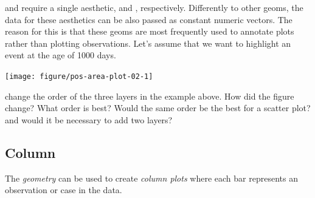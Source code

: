 \documentclass[krantz2]{krantz}\usepackage{knitr}%
\begin{document}
 and  require a single aesthetic,  and , respectively. Differently to other geoms, the data for these aesthetics can be also passed as constant numeric vectors. The reason for this is that these geoms are most frequently used to annotate plots rather than plotting observations. Let's assume that we want to highlight an event at the age of 1000 days.

\begin{knitrout}\footnotesize
{}\color{fgcolor}\begin{kframe}
\begin{alltt}
\hlstd{(} 
       \hlstd{(}      \hlopt{+}
  \hlstd{(} \hlstd{=} \hlstd{)} \hlopt{+}
  \hlstd{(} \hlstd{=} \hlstd{,}  \hlstd{=} \hlstd{)} \hlopt{+}
  \hlstd{(} \hlstd{=} \hlstd{,}  \hlstd{=} \hlstd{)}
\end{alltt}
\end{kframe}

{\centering \texttt{[image: figure/pos-area-plot-02-1]} 

}



\end{knitrout}

\begin{playground}
  change the order of the three layers in the example above. How did the figure change? What order is best? Would the same order be the best for a scatter plot? and would it be necessary to add two  layers?
\end{playground}

\subsection{Column}\label{sec:plot:col}

The \emph{geometry}  can be used to create \emph{column plots} where each bar represents an observation or case in the data.
\end{document}
